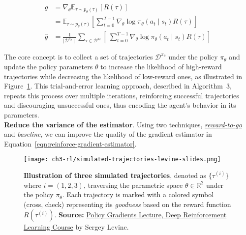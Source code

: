 \begin{equation}\label{eqn:reinforce-gradient-estimator}
    \begin{split}
        g &= \nabla_{\theta}\mathbb{E}_{\tau\sim p_{\theta}(\tau)}[R(\tau)] \\
        &= \mathbb{E}_{\tau\sim p_{\theta}(\tau)}\left[\sum_{t=0}^{T-1} \nabla_{\theta}\log \pi_{\theta} (a_t\mid s_t) R(\tau)\right]  \\
        \hat{g} &= \frac{1}{\mid\mathcal{D}^{\pi_{\theta}}\mid}\sum_{\tau\in\mathcal{D}^{\pi_{\theta}}}\left[~\sum_{t=0}^{T-1} \nabla_{\theta} \log\pi_{\theta} (a_{t}\mid s_{t}) R(\tau) \right]
    \end{split}
\end{equation}

\noindent The core concept is to collect a set of trajectories $\mathcal{D}^{\pi_{\theta}}$ under the policy $\pi_{\theta}$ and update the policy parameters $\theta$ to increase the likelihood of high-reward trajectories while decreasing the likelihood of low-reward ones, as illustrated in Figure~\ref{fig:anatomy-rl-trajectories}. This trial-and-error learning approach, described in Algorithm~3, repeats this process over multiple iterations, reinforcing successful trajectories and discouraging unsuccessful ones, thus encoding the agent's behavior in its parameters. \\

\noindent \textbf{Reduce the variance of the estimator}. Using two techniques,
\href{https://spinningup.openai.com/en/latest/spinningup/rl_intro3.html#don-t-let-the-past-distract-you}{\textit{reward-to-go}} and \textit{baseline}, we can improve the quality of the gradient estimator in Equation~\ref{eqn:reinforce-gradient-estimator}. 

\begin{figure}[ht]
    \centering
    \texttt{[image: ch3-rl/simulated-trajectories-levine-slides.png]}
    \captionsetup{width=\textwidth} %
    \caption{\textbf{Illustration of three simulated trajectories}, denoted as $\{\tau^{(i)}\}$ where $i=(1,2,3)$, traversing the parametric space $\theta\in\mathbb{R}^2$ under the policy $\pi_{\theta}$. Each trajectory is marked with a colored symbol (cross, check) representing its \textit{goodness} based on the reward function $R(\tau^{(i)})$. \textbf{Source:} \href{https://rail.eecs.berkeley.edu/deeprlcourse/}{Policy Gradients Lecture, Deep Reinforcement Learning Course} by Sergey Levine.}
    \label{fig:anatomy-rl-trajectories}
  \end{figure}
  
